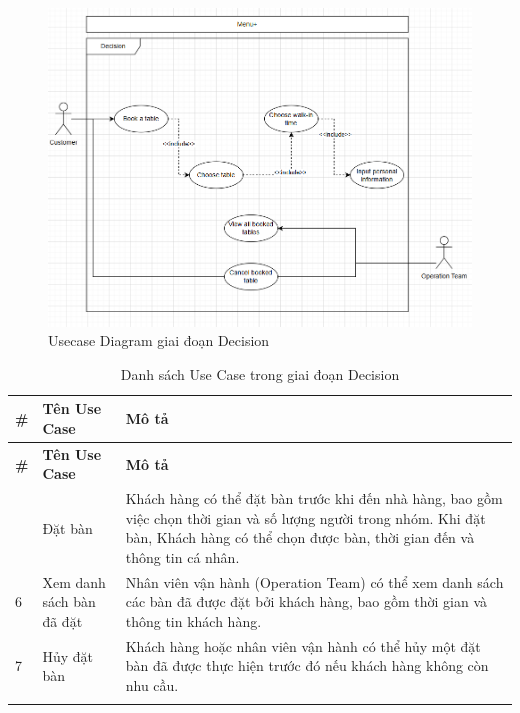         \begin{figure}[H]
	\centering
	\includegraphics[width=\linewidth]{Images/ucd-decision.png}
	\caption{Usecase Diagram giai đoạn Decision}
        \end{figure}
        
        \begin{longtable}{|p{1cm}|p{5cm}|p{9cm}|}
        \hline
        \textbf{\#} & \textbf{Tên Use Case} & \textbf{Mô tả} \\ 
        \hline
        \endfirsthead
        \hline
        \textbf{\#} & \textbf{Tên Use Case} & \textbf{Mô tả} \\ 
        \endhead
        \hline
        \endfoot
        \hline
        \endlastfoot
        5 & Đặt bàn & Khách hàng có thể đặt bàn trước khi đến nhà hàng, bao gồm việc chọn thời gian và số lượng người trong nhóm. Khi đặt bàn, Khách hàng có thể chọn được bàn, thời gian đến và thông tin cá nhân. \\ 
        \hline
        6 & Xem danh sách bàn đã đặt & Nhân viên vận hành (Operation Team) có thể xem danh sách các bàn đã được đặt bởi khách hàng, bao gồm thời gian và thông tin khách hàng. \\ 
        \hline
        7 & Hủy đặt bàn & Khách hàng hoặc nhân viên vận hành có thể hủy một đặt bàn đã được thực hiện trước đó nếu khách hàng không còn nhu cầu. \\ 
        \hline
        \caption{Danh sách Use Case trong giai đoạn Decision}\\
        \end{longtable}

